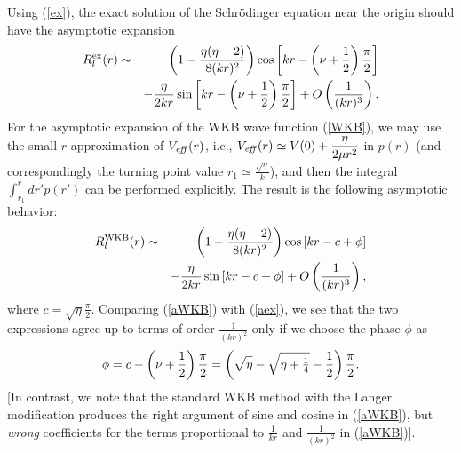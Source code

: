 \documentclass[a4paper,aps,eqsecnum,preprint,preprintnumbers,12pt]{revtex4}
\begin{document}
Using (\ref{ex}), the exact solution of the Schr\"{o}dinger
equation near the origin should have the asymptotic expansion
\begin{eqnarray} \label{aex}
R_{l}^{\rm ex}(r) &\sim& \left( 1 - \frac{\eta(\eta-2)}{8(kr)^{2}}
\right) \cos \left[ kr - \left( \nu+\frac{1}{2} \right)
\frac{\pi}{2} \right] \nonumber \\
&& - \frac{\eta}{2kr} \sin \left[ kr - \left( \nu+\frac{1}{2}
\right) \frac{\pi}{2} \right] + O \left( \frac{1}{(kr)^{3}}
\right).
\end{eqnarray}
For the asymptotic expansion of the WKB wave function (\ref{WKB}),
we may use the small-$r$ approximation of $V_{\it eff}(r)$, i.e.,
$V_{\it eff}(r) \simeq \tilde{V}(0) + \displaystyle
\frac{\eta}{2\mu r^{2}}$ in $p(r)$ (and correspondingly the
turning point value $r_{1} \simeq \displaystyle
\frac{\sqrt{\eta}}{k}$), and then the integral $\displaystyle
\int_{r_{1}}^{r} dr' p(r')$ can be performed explicitly. The
result is the following asymptotic behavior:
\begin{eqnarray} \label{aWKB}
R_{l}^{\rm WKB}(r) &\sim& \left( 1 -
\frac{\eta(\eta-2)}{8(kr)^{2}} \right) \cos \left[ kr - c + \phi
\right] \nonumber \\
&& - \frac{\eta}{2kr} \sin \left[ kr - c + \phi \right] + O \left(
\frac{1}{(kr)^{3}} \right),
\end{eqnarray}
where $c = \sqrt{\eta} \displaystyle \frac{\pi}{2}$. Comparing
(\ref{aWKB}) with (\ref{aex}), we see that the two expressions
agree up to terms of order $\displaystyle \frac{1}{(kr)^{2}}$ only
if we choose the phase $\phi$ as
\begin{equation} \label{phi}
\phi = c - \left( \nu + \frac{1}{2} \right) \frac{\pi}{2} = \left(
\sqrt{ \mathstrut \eta } - \sqrt{ \mathstrut \eta + \textstyle
\frac{1}{4} } - \frac{1}{2} \right) \frac{\pi}{2}.
\end{equation}
[In contrast, we note that the standard WKB method with the Langer
modification produces the right argument of sine and cosine in
(\ref{aWKB}), but {\it wrong} coefficients for the terms
proportional to $\displaystyle \frac{1}{kr}$ and $\displaystyle
\frac{1}{(kr)^{2}}$ in (\ref{aWKB})].
\end{document}
